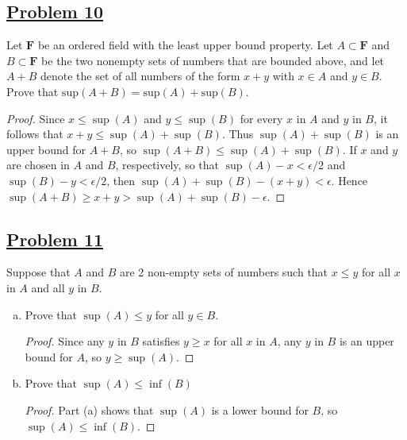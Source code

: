 \documentclass[10pt,letterpaper]{article}
\begin{document}
	\subsection*{{\color{purple}\underline{Problem 10}}}
	Let $\mathbf{F}$ be an ordered field with the least upper bound property. Let $A \subset \mathbf{F}$ and 
	$B \subset \mathbf{F}$ be the two nonempty sets of numbers that are bounded above, and let $A + B$ denote the set
	of all numbers of the form $x + y$ with $x \in A$ and $y \in B$. 
	Prove that $\mathrm{sup}(A + B) = \mathrm{sup}(A) + \mathrm{sup}(B)$. 
	\begin{proof}
	Since $x \leq \sup(A)$ and $y \leq \sup(B)$ for every $x$ in $A$ and $y$ in $B$, it follows that
	$x + y \leq \sup(A) + \sup(B)$. Thus $\sup(A) + \sup(B)$ is an upper bound for $A + B$, so 
	$\sup(A + B) \leq \sup(A) + \sup(B)$. If $x$ and $y$ are chosen in $A$ and $B$, respectively,
	so that $\sup(A) - x < \epsilon/2$ and $\sup(B) - y < \epsilon/2$, then $\sup(A) + \sup(B) - (x + y) < \epsilon$.
	Hence $\sup(A + B) \geq x + y > \sup(A) + \sup(B) - \epsilon$.
	\end{proof}	 
	
	\subsection*{{\color{purple}\underline{Problem 11}}}
	Suppose that $A$ and $B$ are 2 non-empty sets of numbers such that $x \leq y$ for all $x$
	in $A$ and all $y$ in $B$.
	\begin{enumerate}[(a)]
		\item Prove that $\sup(A) \leq y$ for all $y \in B$.
		\begin{proof}
			Since any $y$ in $B$ satisfies $y \geq x$ for all $x$ in $A$, any $y$ in $B$ is an upper bound
			for $A$, so $y \geq \sup(A)$.
		\end{proof}
		\item Prove that $\sup(A) \leq \inf(B)$
		\begin{proof}
			Part (a) shows that $\sup(A)$ is a lower bound for $B$, so $\sup(A) \leq \inf(B)$.
		\end{proof}
	\end{enumerate}
\end{document}
